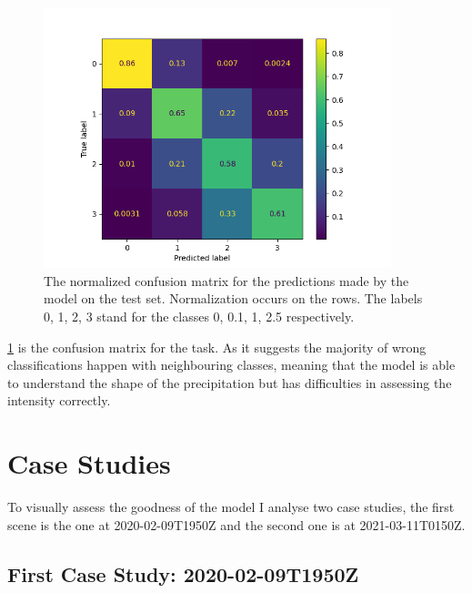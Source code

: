 \begin{figure}[!h]
    \centering
    \includegraphics[width=0.9\textwidth]{normlized_confmatrix_test_2022-05-11 15:41:17.958023.png}
    \caption{The normalized confusion matrix for the predictions made by the model on the test set. Normalization occurs on the rows. The labels 0, 1, 2, 3 stand for the classes 0, 0.1, 1, 2.5 respectively.}
    \label{fig:confusion_matrix}
\end{figure}

\cref{fig:confusion_matrix} is the confusion matrix for the task. As it suggests the majority of wrong classifications happen with neighbouring classes, meaning that the model is able to understand the shape of the precipitation but has difficulties in assessing the intensity correctly.

\section{Case Studies}
To visually assess the goodness of the model I analyse two case studies, the first scene is the one at 2020-02-09T1950Z and the second one is at 2021-03-11T0150Z.

\subsection{First Case Study: 2020-02-09T1950Z}
